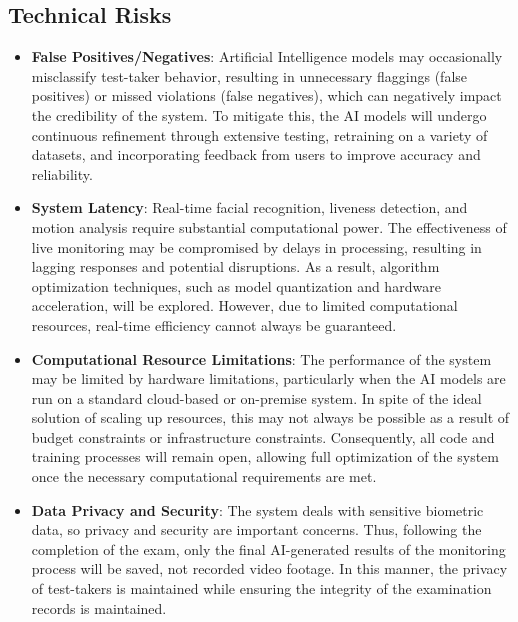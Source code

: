 \documentclass[12pt,a4paper]{article}
\begin{document}
\subsection{Technical Risks}

\begin{itemize}
    \item \textbf{False Positives/Negatives}:  
    Artificial Intelligence models may occasionally misclassify test-taker behavior, resulting in unnecessary flaggings (false positives) or missed violations (false negatives), which can negatively impact the credibility of the system. To mitigate this, the AI models will undergo continuous refinement through extensive testing, retraining on a variety of datasets, and incorporating feedback from users to improve accuracy and reliability.

    \item \textbf{System Latency}:  
    Real-time facial recognition, liveness detection, and motion analysis require substantial computational power. The effectiveness of live monitoring may be compromised by delays in processing, resulting in lagging responses and potential disruptions. As a result, algorithm optimization techniques, such as model quantization and hardware acceleration, will be explored. However, due to limited computational resources, real-time efficiency cannot always be guaranteed.

    \item \textbf{Computational Resource Limitations}:  
    The performance of the system may be limited by hardware limitations, particularly when the AI models are run on a standard cloud-based or on-premise system. In spite of the ideal solution of scaling up resources, this may not always be possible as a result of budget constraints or infrastructure constraints. Consequently, all code and training processes will remain open, allowing full optimization of the system once the necessary computational requirements are met.

    \item \textbf{Data Privacy and Security}:  
    The system deals with sensitive biometric data, so privacy and security are important concerns. Thus, following the completion of the exam, only the final AI-generated results of the monitoring process will be saved, not recorded video footage. In this manner, the privacy of test-takers is maintained while ensuring the integrity of the examination records is maintained.
\end{itemize}
\end{document}
